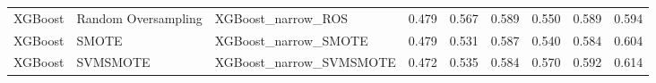 \begin{tabular}{lllllllll}
                     XGBoost & Random Oversampling &                           XGBoost\_narrow\_ROS & 0.479 &                     0.567 &                 0.589 &                  0.550 &                                   0.589 &    0.594 \\
                     XGBoost &               SMOTE &                         XGBoost\_narrow\_SMOTE & 0.479 &                     0.531 &                 0.587 &                  0.540 &                                   0.584 &    0.604 \\
                     XGBoost &            SVMSMOTE &                      XGBoost\_narrow\_SVMSMOTE & 0.472 &                     0.535 &                 0.584 &                  0.570 &                                   0.592 &    0.614 \\
\bottomrule
\end{tabular}
